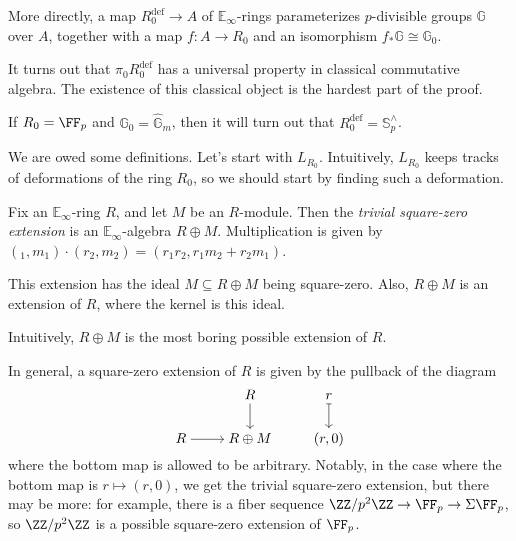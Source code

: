 \documentclass[../notes.tex]{subfiles}
\begin{document}
\begin{remark}
	More directly, a map $R_0^{\mathrm{def}}\to A$ of $\mathbb E_\infty$-rings parameterizes $p$-divisible groups $\mathbb G$ over $A$, together with a map $f\colon A\to R_0$ and an isomorphism $f_*\mathbb G\cong\mathbb G_0$.
\end{remark}
\begin{remark}
	It turns out that $\pi_0R_0^{\mathrm{def}}$ has a universal property in classical commutative algebra. The existence of this classical object is the hardest part of the proof.
\end{remark}
\begin{example}
	If $R_0=\FF_p$ and $\mathbb G_0=\widehat{\mathbb G}_m$, then it will turn out that $R_0^{\mathrm{def}}=\mathbb S_p^\land$.
\end{example}
We are owed some definitions. Let's start with $L_{R_0}$. Intuitively, $L_{R_0}$ keeps tracks of deformations of the ring $R_0$, so we should start by finding such a deformation.
\begin{definition}
	Fix an $\mathbb E_\infty$-ring $R$, and let $M$ be an $R$-module. Then the \textit{trivial square-zero extension} is an $\mathbb E_\infty$-algebra $R\oplus M$. Multiplication is given by $(_1,m_1)\cdot(r_2,m_2)=(r_1r_2,r_1m_2+r_2m_1)$.
\end{definition}
\begin{remark}
	This extension has the ideal $M\subseteq R\oplus M$ being square-zero. Also, $R\oplus M$ is an extension of $R$, where the kernel is this ideal.
\end{remark}
\begin{remark}
	Intuitively, $R\oplus M$ is the most boring possible extension of $R$.
\end{remark}
\begin{remark}
	In general, a square-zero extension of $R$ is given by the pullback of the diagram
	\[\begin{tikzcd}[cramped]
		& R & r \\
		R & {R\oplus M} & {(r,0)}
		\arrow[from=1-2, to=2-2]
		\arrow[maps to, from=1-3, to=2-3]
		\arrow[from=2-1, to=2-2]
	\end{tikzcd}\]
	where the bottom map is allowed to be arbitrary. Notably, in the case where the bottom map is $r\mapsto(r,0)$, we get the trivial square-zero extension, but there may be more: for example, there is a fiber sequence $\ZZ/p^2\ZZ\to\FF_p\to\Sigma\FF_p$, so $\ZZ/p^2\ZZ$ is a possible square-zero extension of $\FF_p$.
\end{remark}
\end{document}
